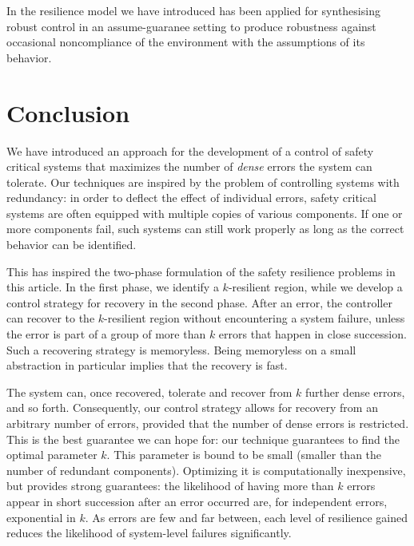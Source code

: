 \documentclass[times,10pt,twocolumn]{article}
\newcounter{sequent1}
\newcounter{sequent2}
\newcounter{sequent3}
\newcounter{sequent4}
\begin{document}


In \cite{EhlersT14,BloemEJK14} the resilience model we have introduced \cite{HPSW/12/rapidRecovery} has been applied for synthesising robust control in an assume-guaranee setting to produce robustness against occasional noncompliance of the environment with the assumptions of its behavior.


\section{Conclusion \label{sec.conc}}
We have introduced an approach for the development of a control of safety critical
systems that maximizes the number of \emph{dense} errors the system can tolerate.
Our techniques are inspired by the problem of controlling systems with redundancy:
in order to deflect the effect of individual errors, safety critical systems are often equipped with multiple copies of various components.
If one or more components fail, such systems can still work properly as long as the correct behavior can be identified.
 
This has inspired the two-phase formulation of the safety resilience problems in this article.
In the first phase, we identify a $k$-resilient region\label{reply2.need.identify},  
while\label{reply2.layer} we develop a control strategy for recovery in the second phase.  
After an error, the controller can recover to the $k$-resilient region without encountering a system failure, unless the error is part of a group of more than $k$ errors that happen in close succession.
Such a recovering strategy is memoryless.
Being memoryless on a small abstraction in particular implies that the recovery is fast.

The system can, once recovered, tolerate and recover from $k$ further dense errors, and so forth.
Consequently, our control strategy allows for recovery from an arbitrary
number of errors, provided that the number of dense errors is restricted.
This is the best guarantee we can hope for: our technique guarantees to find the optimal parameter $k$.
%
This parameter is bound to be small (smaller than the number of redundant components).
Optimizing it is computationally inexpensive, but provides strong guarantees: the likelihood of having more than $k$ errors appear in short succession after an error occurred are, for independent errors, exponential in $k$. As errors are few and far between, each level of resilience gained reduces the likelihood of 
system-level failures significantly.
\end{document}

